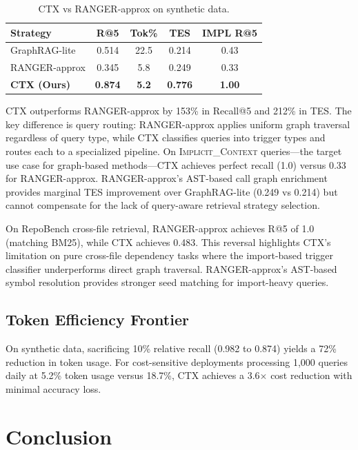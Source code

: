 \documentclass[11pt]{article}
\begin{document}
\begin{table}[t]
\centering
\small
\caption{CTX vs RANGER-approx on synthetic data.}
\label{tab:ranger}
\begin{tabular}{@{}lcccc@{}}
\toprule
\textbf{Strategy} & \textbf{R@5} & \textbf{Tok\%} & \textbf{TES} & \textbf{IMPL R@5} \\
\midrule
GraphRAG-lite & 0.514 & 22.5 & 0.214 & 0.43 \\
RANGER-approx & 0.345 & 5.8 & 0.249 & 0.33 \\
\textbf{CTX (Ours)} & \textbf{0.874} & \textbf{5.2} & \textbf{0.776} & \textbf{1.00} \\
\bottomrule
\end{tabular}
\end{table}

CTX outperforms RANGER-approx by 153\% in Recall@5 and 212\% in TES. The key difference is query routing: RANGER-approx applies uniform graph traversal regardless of query type, while CTX classifies queries into trigger types and routes each to a specialized pipeline. On \textsc{Implicit\_Context} queries---the target use case for graph-based methods---CTX achieves perfect recall (1.0) versus 0.33 for RANGER-approx. RANGER-approx's AST-based call graph enrichment provides marginal TES improvement over GraphRAG-lite (0.249 vs 0.214) but cannot compensate for the lack of query-aware retrieval strategy selection.

On RepoBench cross-file retrieval, RANGER-approx achieves R@5 of 1.0 (matching BM25), while CTX achieves 0.483. This reversal highlights CTX's limitation on pure cross-file dependency tasks where the import-based trigger classifier underperforms direct graph traversal. RANGER-approx's AST-based symbol resolution provides stronger seed matching for import-heavy queries.

\subsection{Token Efficiency Frontier}

On synthetic data, sacrificing 10\% relative recall (0.982 to 0.874) yields a 72\% reduction in token usage. For cost-sensitive deployments processing 1,000 queries daily at 5.2\% token usage versus 18.7\%, CTX achieves a 3.6$\times$ cost reduction with minimal accuracy loss.

\section{Conclusion}
\end{document}
